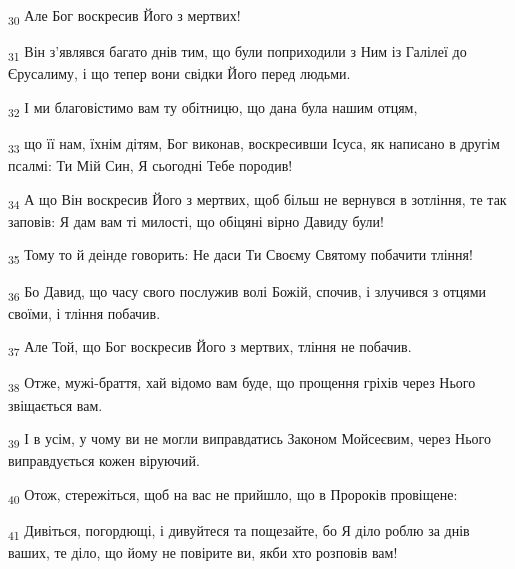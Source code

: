 \begin{tcolorbox}
\textsubscript{30} Але Бог воскресив Його з мертвих!
\end{tcolorbox}
\begin{tcolorbox}
\textsubscript{31} Він з'являвся багато днів тим, що були поприходили з Ним із Галілеї до Єрусалиму, і що тепер вони свідки Його перед людьми.
\end{tcolorbox}
\begin{tcolorbox}
\textsubscript{32} І ми благовістимо вам ту обітницю, що дана була нашим отцям,
\end{tcolorbox}
\begin{tcolorbox}
\textsubscript{33} що її нам, їхнім дітям, Бог виконав, воскресивши Ісуса, як написано в другім псалмі: Ти Мій Син, Я сьогодні Тебе породив!
\end{tcolorbox}
\begin{tcolorbox}
\textsubscript{34} А що Він воскресив Його з мертвих, щоб більш не вернувся в зотління, те так заповів: Я дам вам ті милості, що обіцяні вірно Давиду були!
\end{tcolorbox}
\begin{tcolorbox}
\textsubscript{35} Тому то й деінде говорить: Не даси Ти Своєму Святому побачити тління!
\end{tcolorbox}
\begin{tcolorbox}
\textsubscript{36} Бо Давид, що часу свого послужив волі Божій, спочив, і злучився з отцями своїми, і тління побачив.
\end{tcolorbox}
\begin{tcolorbox}
\textsubscript{37} Але Той, що Бог воскресив Його з мертвих, тління не побачив.
\end{tcolorbox}
\begin{tcolorbox}
\textsubscript{38} Отже, мужі-браття, хай відомо вам буде, що прощення гріхів через Нього звіщається вам.
\end{tcolorbox}
\begin{tcolorbox}
\textsubscript{39} І в усім, у чому ви не могли виправдатись Законом Мойсеєвим, через Нього виправдується кожен віруючий.
\end{tcolorbox}
\begin{tcolorbox}
\textsubscript{40} Отож, стережіться, щоб на вас не прийшло, що в Пророків провіщене:
\end{tcolorbox}
\begin{tcolorbox}
\textsubscript{41} Дивіться, погордющі, і дивуйтеся та пощезайте, бо Я діло роблю за днів ваших, те діло, що йому не повірите ви, якби хто розповів вам!
\end{tcolorbox}
